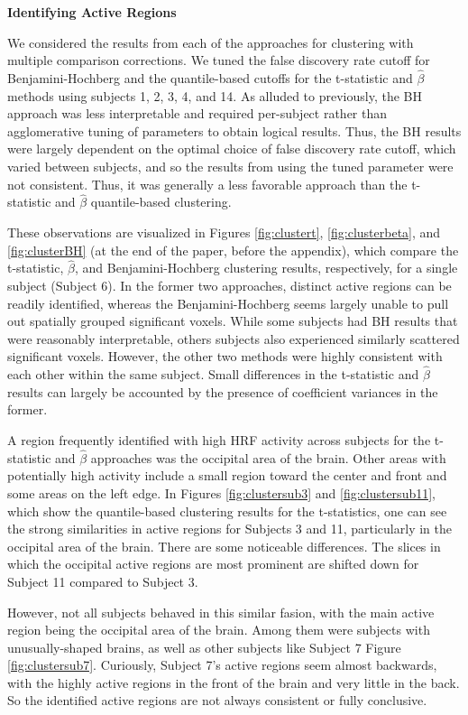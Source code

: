 \noindent \textbf{Identifying Active Regions}

We considered the results from each of the approaches for clustering with 
multiple comparison corrections. We tuned the false discovery rate cutoff for 
Benjamini-Hochberg and the quantile-based cutoffs for the t-statistic and 
$\hat{\beta}$ methods using subjects 1, 2, 3, 4, and 14. As alluded to 
previously, the BH approach was less interpretable and required per-subject 
rather than agglomerative tuning of parameters to obtain logical results. 
Thus, the BH results were largely dependent on the optimal choice of false 
discovery rate cutoff, which varied between subjects, and so the results from 
using the tuned parameter were not consistent. Thus, it was generally a less 
favorable approach than the t-statistic and $\hat{\beta}$ quantile-based 
clustering. 

These observations are visualized in Figures \ref{fig:clustert}, 
\ref{fig:clusterbeta}, and \ref{fig:clusterBH} (at the end of the paper, 
before the appendix), which compare the t-statistic, $\hat{\beta}$, and 
Benjamini-Hochberg clustering results, respectively, for a 
single subject (Subject 6). In the former two approaches, distinct active 
regions can be readily identified, whereas the Benjamini-Hochberg seems 
largely unable to pull out spatially grouped significant voxels. While some 
subjects had BH results that were reasonably interpretable, others subjects 
also experienced similarly scattered significant voxels. However, the other 
two methods were highly consistent with each other within the same subject. 
Small differences in the t-statistic and $\hat{\beta}$ results can largely be 
accounted by the presence of coefficient variances in the former. 

A region frequently identified with high HRF activity across subjects for the 
t-statistic and $\hat{\beta}$ approaches was the occipital area of the brain. 
Other areas with potentially high activity include a small region toward the 
center and front and some areas on the left edge. In Figures 
\ref{fig:clustersub3} and \ref{fig:clustersub11}, which show the 
quantile-based clustering results for the t-statistics, one can see the strong 
similarities in active regions for Subjects 3 and 11, particularly in the 
occipital area of the brain. There are some noticeable differences. The slices in which 
the occipital active regions are most prominent are shifted down for Subject 11 
compared to Subject 3. 

However, not all subjects behaved in this similar fasion, with the main active 
region being the occipital area of the brain. Among them were subjects with 
unusually-shaped brains, as well as other subjects like Subject 7 Figure 
\ref{fig:clustersub7}. Curiously, Subject 7's active regions seem almost 
backwards, with the highly active regions in the front of the brain and very 
little in the back. So the identified active regions are not always 
consistent or fully conclusive. 




